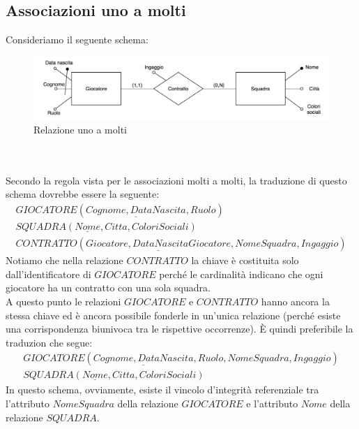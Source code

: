 \subsection{Associazioni uno a molti}
Consideriamo il seguente schema:
    \begin{figure}[h!]
        \centering
        \includegraphics[scale = 0.5]{15/img8}
        \caption{Relazione uno a molti}
    \end{figure}\\\\
Secondo la regola vista per le associazioni molti a molti, la traduzione di questo schema dovrebbe essere la seguente: 
    \begin{equation}\begin{aligned}
        GIOCATORE(\underline{Cognome, DataNascita}, Ruolo)\\
        SQUADRA(\underline{Nome}, Citta, ColoriSociali)\\
        CONTRATTO(\underline{Giocatore, DataNascitaGiocatore}, NomeSquadra, Ingaggio)
    \end{aligned}\end{equation}
Notiamo che nella relazione $CONTRATTO$ la chiave è costituita solo dall'identificatore di $GIOCATORE$ perché le cardinalità indicano che ogni giocatore ha un contratto con una sola squadra.\\
A questo punto le relazioni $GIOCATORE$ e $CONTRATTO$ hanno ancora la stessa chiave ed è ancora possibile fonderle in un'unica relazione (perché esiste una corrispondenza biunivoca tra le rispettive occorrenze). È quindi preferibile la traduzion che segue:
    \begin{equation}\begin{aligned}
        GIOCATORE(\underline{Cognome, DataNascita}, Ruolo, NomeSquadra, Ingaggio)\\
        SQUADRA(\underline{Nome}, Citta, ColoriSociali)
    \end{aligned}\end{equation}
In questo schema, ovviamente, esiste il vincolo d'integrità referenziale tra l'attributo $NomeSquadra$ della relazione $GIOCATORE$ e l'attributo $Nome$ della relazione $SQUADRA$.\\\\
